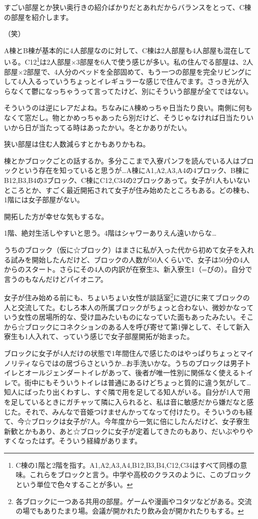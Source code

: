 \begin{multicols}{2}
  すごい部屋とか狭い奥行きの紹介ばかりだとあれだからバランスをとって、C棟の部屋を紹介します。

  （笑）

  A棟とB棟が基本的に4人部屋なのに対して、C棟は2人部屋も4人部屋も混在している。C12\footnote{C棟の1階と2階を指す。A1,A2,A3,A4,B12,B3,B4,C12,C34はすべて同様の意味。これらをブロックと言う。中学や高校のクラスのように、このブロックという単位で色々することが多い。}は2人部屋$\times$3部屋を6人で使う感じが多い。私の住んでる部屋は、2人部屋$\times$2部屋で、4人分のベッドを全部固めて、もう一つの部屋を完全リビングにして4人入るっていうちょっとイレギュラーな感じで住んでます。さっき光が入らなくて鬱になっちゃうって言ってたけど、別にそういう部屋が全てではない。

  そういうのは逆にレアだよね。ちなみにA棟めっちゃ日当たり良い。南側に何もなくて窓だし。物とかめっちゃあったら別だけど、そうじゃなければ日当たりいいから日が当たってる時はあったかい。冬とかありがたい。

  狭い部屋は住む人数減らすとかもありかもね。

  棟とかブロックごとの話するか。多分ここまで入寮パンフを読んでいる人はブロックという存在を知っていると思うが…A棟にA1,A2,A3,A4の4ブロック、B棟にB12,B3,B4の3ブロック、C棟にC12,C34の2ブロックあって。女子が1人もいないところとか、すごく最近開拓されて女子が住み始めたところもある。どの棟も、1階には女子部屋がない。

  開拓した方が幸せな気もするな。

  1階、絶対生活しやすいと思う。4階はシャワーありえん遠いからな…

  うちのブロック（仮に☆ブロック）はまさに私が入った代から初めて女子を入れる試みを開始したんだけど、ブロックの人数が50人くらいで、女子は50分の4人からのスタート。さらにその4人の内訳が在寮生3、新入寮生1（=ぴの）。自分で言うのもなんだけどパイオニア。

  女子が住み始める前にも、ちょいちょい女性が談話室\footnote{各ブロックに一つある共用の部屋。ゲームや漫画やコタツなどがある。交流の場でもありたまり場。会議が開かれたり飲み会が開かれたりもする。}に遊びに来てブロックの人と交流してた。むしろ本人の所属ブロックがちょっと合わない、微妙かなっていう女性の居場所的な、受け皿みたいものになっていた面もあったみたい。そこから☆ブロックにコネクションのある人を呼び寄せて第1弾として、そして新入寮生も1人入れて、っていう感じで女子部屋開拓が始まった。

  ブロックに女子が4人だけの状態で1年間住んで感じたのはやっぱりちょっとマイノリティならではの居づらさというか…お手洗いかな。うちのブロックは男子トイレとオールジェンダートイレがあって、後者が唯一性別に関係なく使えるトイレで。街中にもそういうトイレは普通にあるけどちょっと質的に違う気がして…知人にばったり出くわすし、すぐ隣で用を足してる知人がいる。自分が1人で用を足しているときにガチャッて隣に入られると、私は音に敏感だから嫌だなと感じた。それで、みんなで音姫つけませんかってなって付けたり。そういうのも経て、今☆ブロックは女子が7人。今年度から一気に倍にしたんだけど、女子寮生新歓とかもあり、あと☆ブロックに女子が定着してきたのもあり、だいぶやりやすくなったはず。そういう経緯があります。


\end{multicols}
